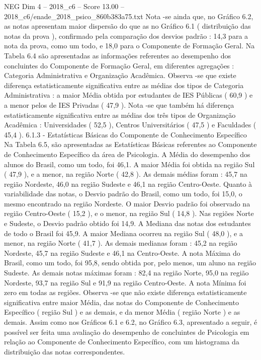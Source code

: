 \begin{textsample}{NEG Dim 4 – 2018\_c6 – Score 13.00 – 2018\_c6/enade\_2018\_psico\_860b383a75.txt}
Nota -se ainda que, no Gráfico 6.2, as notas apresentam maior dispersão do que as no Gráfico 6.1 ( distribuição das notas da prova ), confirmado pela comparação dos desvios padrão : 14,3 para a nota da prova, como um todo, e 18,0 para o Componente de Formação Geral.
Na Tabela 6.4 são apresentadas as informações referentes ao desempenho dos concluintes do Componente de Formação Geral, em diferentes agregações : Categoria Administrativa e Organização Acadêmica.
Observa -se que existe diferença estatisticamente significativa entre as médias dos tipos de Categoria Administrativa : a maior Média obtida por estudantes de IES Públicas ( 60,9 ) e a menor pelos de IES Privadas ( 47,9 ).
Nota -se que também há diferença estatisticamente significativa entre as médias dos três tipos de Organização Acadêmica : Universidades ( 52,5 ), Centros Universitários ( 47,5 ) e Faculdades ( 45,4 ). 6.1.3 - Estatísticas Básicas do Componente de Conhecimento Específico Na Tabela 6.5, são apresentadas as Estatísticas Básicas referentes ao Componente de Conhecimento Específico da área de Psicologia.
A Média do desempenho dos alunos do Brasil, como um todo, foi 46,1.
A maior Média foi obtida na região Sul ( 47,9 ), e a menor, na região Norte ( 42,8 ).
As demais médias foram : 45,7 na região Nordeste, 46,0 na região Sudeste e 46,1 na região Centro-Oeste.
Quanto à variabilidade das notas, o Desvio padrão do Brasil, como um todo, foi 15,0, o mesmo encontrado na região Nordeste.
O maior Desvio padrão foi observado na região Centro-Oeste ( 15,2 ), e o menor, na região Sul ( 14,8 ).
Nas regiões Norte e Sudeste, o Desvio padrão obtido foi 14,9.
A Mediana das notas dos estudantes de todo o Brasil foi 45,9.
A maior Mediana ocorreu na região Sul ( 48,0 ), e a menor, na região Norte ( 41,7 ).
As demais medianas foram : 45,2 na região Nordeste, 45,7 na região Sudeste e 46,1 na Centro-Oeste.
A nota Máxima do Brasil, como um todo, foi 95,8, sendo obtida por, pelo menos, um aluno na região Sudeste.
As demais notas máximas foram : 82,4 na região Norte, 95,0 na região Nordeste, 93,7 na região Sul e 91,9 na região Centro-Oeste.
A nota Mínima foi zero em todas as regiões.
Observa -se que não existe diferença estatisticamente significativa entre maior Média, das notas do Componente de Conhecimento Específico ( região Sul ) e as demais, e da menor Média ( região Norte ) e as demais.
Assim como nos Gráficos 6.1 e 6.2, no Gráfico 6.3, apresentado a seguir, é possível ser feita uma avaliação do desempenho de concluintes de Psicologia em relação ao Componente de Conhecimento Específico, com um histograma da distribuição das notas correspondentes.

\end{textsample}
